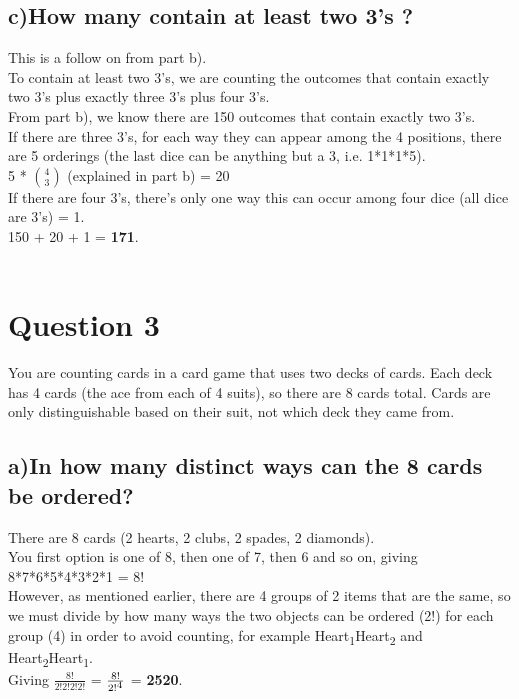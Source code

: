 \documentclass{report}
\begin{document}
		\subsection*{c)How many contain at least two 3’s ?}
		This is a follow on from part b).\\To contain at least two 3's, we are counting the outcomes that contain exactly two 3's plus exactly three 3's plus four 3's.\\
		From part b), we know there are 150 outcomes that contain exactly two 3's.\\
		If there are three 3's, for each way they can appear among the 4 positions, there are 5 orderings (the last dice can be anything but a 3, i.e. 1*1*1*5).\\
		5 * ${4 \choose 3}$ (explained in part b) = 20\\
		If there are four 3's, there's only one way this can occur among four dice (all dice are 3's) = 1.\\
		150 + 20 + 1 = \textbf{171}.\\\\
		
		\section*{\hfil Question 3 \hfil}
		You are counting cards in a card game that uses two decks of cards. Each deck has 4 cards (the ace from each of 4 suits), so there are 8 cards total. Cards are only distinguishable based on their suit, not which deck they came from.
		\subsection*{a)In how many distinct ways can the 8 cards be ordered?}
		There are 8 cards (2 hearts, 2 clubs, 2 spades, 2 diamonds).\\You first option is one of 8, then one of 7, then 6 and so on, giving 8*7*6*5*4*3*2*1 = 8!\\
		However, as mentioned earlier, there are 4 groups of 2 items that are the same, so we must divide by how many ways the two objects can be ordered (2!) for each group (4) in order to avoid counting, for example Heart\textsubscript{1}Heart\textsubscript{2} and Heart\textsubscript{2}Heart\textsubscript{1}.\\Giving $\frac{8!}{2!2!2!2!}$ = $\frac{8!}{2!\textsuperscript{4}}$ = \textbf{2520}.
\end{document}
